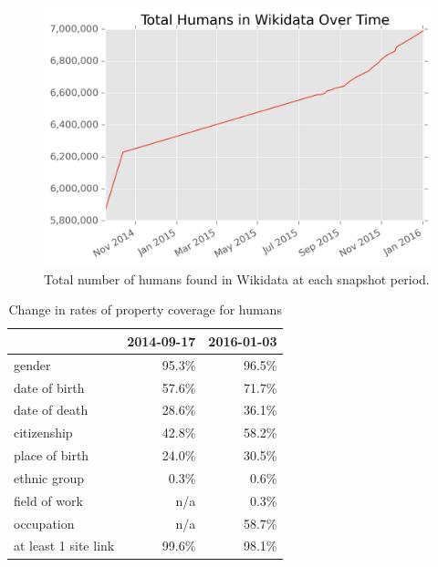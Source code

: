 \documentclass[letterpaper]{article}
\begin{document}
\begin{figure}
\includegraphics[scale=0.6]{figures/totalhumans.png} 
\caption{Total number of humans found in Wikidata at each snapshot period.}
\label{fig:totalhumans}
\end{figure}

\begin{table}
\caption{Change in rates of property coverage for humans}
\begin{tabular}{lrr}
\toprule
{} &  2014-09-17 &  2016-01-03 \\
\midrule
gender               &       95.3\% &       96.5\% \\
date of birth        &       57.6\% &       71.7\% \\
date of death        &       28.6\% &       36.1\% \\
citizenship          &       42.8\% &       58.2\% \\
place of birth       &       24.0\% &       30.5\% \\
ethnic group         &        0.3\% &        0.6\% \\
field of work        &        n/a &        0.3\% \\
occupation           &        n/a &       58.7\% \\
at least 1 site link &       99.6\% &       98.1\% \\
\bottomrule
\end{tabular}
\label{table:accompanying}
\end{table}
\end{document}
